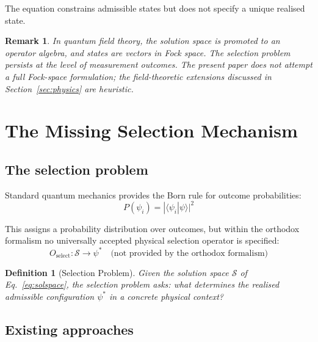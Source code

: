 \documentclass[12pt]{article}
\newtheorem{definition}[theorem]{Definition}
\newtheorem{remark}[theorem]{Remark}
\begin{document}
The equation constrains admissible states but does not specify a unique realised state.

\begin{remark}
In quantum field theory, the solution space is promoted to an operator algebra, and states are vectors in Fock space. The selection problem persists at the level of measurement outcomes. The present paper does not attempt a full Fock-space formulation; the field-theoretic extensions discussed in Section~\ref{sec:physics} are heuristic.
\end{remark}

\section{The Missing Selection Mechanism}\label{sec:gap}

\subsection{The selection problem}

Standard quantum mechanics provides the Born rule for outcome probabilities:
\begin{equation}
    P(\psi_i) = |\langle\psi_i|\psi\rangle|^2
\end{equation}

This assigns a probability distribution over outcomes, but within the orthodox formalism no universally accepted physical selection operator is specified:
\begin{equation}
    O_{\text{select}} : \mathcal{S} \to \psi^* \quad \text{(not provided by the orthodox formalism)}
\end{equation}

\begin{definition}[Selection Problem]
Given the solution space $\mathcal{S}$ of Eq.~\eqref{eq:solspace}, the selection problem asks: what determines the realised admissible configuration $\psi^*$ in a concrete physical context?
\end{definition}

\subsection{Existing approaches}
\end{document}
